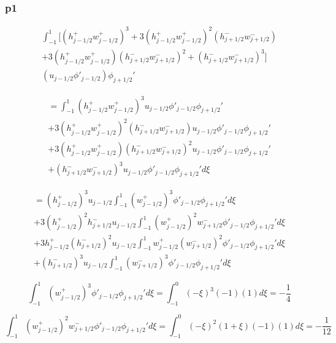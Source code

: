 \documentclass[12pt]{article}
\begin{document}
\subsubsection{p1}

\begin{multline}
\int_{-1}^{1} \bigg[ \left(h^+_{j- 1/2}w^+_{j - 1/2}\right)^3 + 3 \left(h^+_{j- 1/2}w^+_{j - 1/2}\right)^2\left(h^-_{j+ 1/2}w^-_{j + 1/2}\right) \\ + 3\left(h^+_{j- 1/2}w^+_{j - 1/2}\right)\left(h^-_{j+ 1/2}w^-_{j + 1/2}\right)^2 +\left(h^-_{j+ 1/2}w^-_{j + 1/2}\right)^3 \bigg] \\ \left(u_{j- 1/2}\phi'_{j - 1/2} \right)\phi_{j+1/2}'
\end{multline}

\begin{multline}
= \int_{-1}^{1} \left(h^+_{j- 1/2}w^+_{j - 1/2}\right)^3u_{j- 1/2}\phi'_{j - 1/2} \phi_{j+1/2}'\\  + 3 \left(h^+_{j- 1/2}w^+_{j - 1/2}\right)^2\left(h^-_{j+ 1/2}w^-_{j + 1/2}\right)u_{j- 1/2}\phi'_{j - 1/2}\phi_{j+1/2}' \\ + 3\left(h^+_{j- 1/2}w^+_{j - 1/2}\right)\left(h^-_{j+ 1/2}w^-_{j + 1/2}\right)^2u_{j- 1/2}\phi'_{j - 1/2} \phi_{j+1/2}' \\+\left(h^-_{j+ 1/2}w^-_{j + 1/2}\right)^3u_{j- 1/2}\phi'_{j - 1/2}\phi_{j+1/2}' d\xi
\end{multline}

\begin{multline}
= \left(h^+_{j- 1/2}\right)^3u_{j- 1/2}\int_{-1}^{1} \left(w^+_{j - 1/2}\right)^3\phi'_{j - 1/2} \phi_{j+1/2}' d\xi\\  + 3 \left(h^+_{j- 1/2}\right)^2h^-_{j+ 1/2} u_{j- 1/2}\int_{-1}^{1} \left(w^+_{j - 1/2}\right)^2w^-_{j + 1/2}\phi'_{j - 1/2}\phi_{j+1/2}' d\xi \\ + 3h^+_{j- 1/2}\left(h^-_{j+ 1/2}\right)^2u_{j- 1/2} \int_{-1}^{1}w^+_{j - 1/2}\left(w^-_{j + 1/2}\right)^2\phi'_{j - 1/2} \phi_{j+1/2}' d\xi \\+\left(h^-_{j+ 1/2}\right)^3u_{j- 1/2}\int_{-1}^{1}\left(w^-_{j + 1/2}\right)^3\phi'_{j - 1/2}\phi_{j+1/2}' d\xi
\end{multline}

\[\int_{-1}^{1} \left(w^+_{j - 1/2}\right)^3\phi'_{j - 1/2} \phi_{j+1/2}' d\xi =\int_{-1}^{0} \left(-\xi\right)^3(-1)(1) d\xi  = -\frac{1}{4}\]

\[\int_{-1}^{1} \left(w^+_{j - 1/2}\right)^2w^-_{j + 1/2}\phi'_{j - 1/2}\phi_{j+1/2}' d\xi = \int_{-1}^{0} (-\xi)^2(1 + \xi)(-1)(1)  d\xi =  - \frac{1}{12}\]
\end{document}
